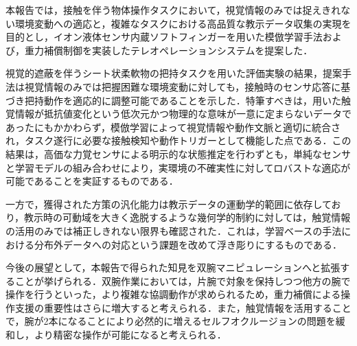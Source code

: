 

本報告では，接触を伴う物体操作タスクにおいて，視覚情報のみでは捉えきれない環境変動への適応と，複雑なタスクにおける高品質な教示データ収集の実現を目的とし，イオン液体センサ内蔵ソフトフィンガーを用いた模倣学習手法および，重力補償制御を実装したテレオペレーションシステムを提案した．

視覚的遮蔽を伴うシート状柔軟物の把持タスクを用いた評価実験の結果，提案手法は視覚情報のみでは把握困難な環境変動に対しても，接触時のセンサ応答に基づき把持動作を適応的に調整可能であることを示した．特筆すべきは，用いた触覚情報が抵抗値変化という低次元かつ物理的な意味が一意に定まらないデータであったにもかかわらず，模倣学習によって視覚情報や動作文脈と適切に統合され，タスク遂行に必要な接触検知や動作トリガーとして機能した点である．この結果は，高価な力覚センサによる明示的な状態推定を行わずとも，単純なセンサと学習モデルの組み合わせにより，実環境の不確実性に対してロバストな適応が可能であることを実証するものである．\par

一方で，獲得された方策の汎化能力は教示データの運動学的範囲に依存しており，教示時の可動域を大きく逸脱するような幾何学的制約に対しては，触覚情報の活用のみでは補正しきれない限界も確認された．これは，学習ベースの手法における分布外データへの対応という課題を改めて浮き彫りにするものである．\par


今後の展望として，本報告で得られた知見を双腕マニピュレーションへと拡張することが挙げられる．双腕作業においては，片腕で対象を保持しつつ他方の腕で操作を行うといった，より複雑な協調動作が求められるため，重力補償による操作支援の重要性はさらに増大すると考えられる．また，触覚情報を活用することで，腕が2本になることにより必然的に増えるセルフオクルージョンの問題を緩和し，より精密な操作が可能になると考えられる．\par